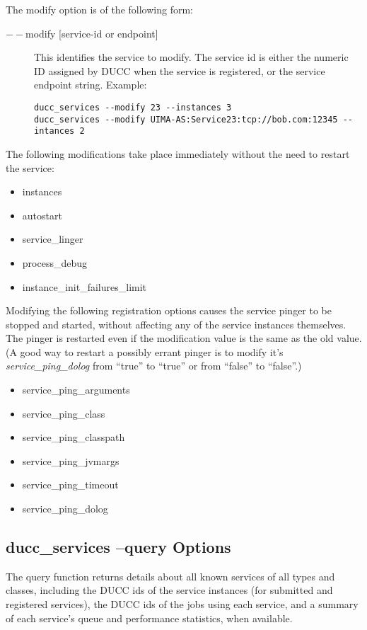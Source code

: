     The modify option is of the following form:
    \begin{description}

        \item[$--$modify {[service-id or endpoint]}]  This identifies the service to modify. The service id is either
          the numeric ID assigned by DUCC when the service is registered, or the service endpoint
          string.  Example:
\begin{verbatim}
ducc_services --modify 23 --instances 3 
ducc_services --modify UIMA-AS:Service23:tcp://bob.com:12345 --intances 2 
\end{verbatim}    
    \end{description}

    The following modifications take place immediately without the need to restart the service:
    \begin{itemize}
      \item instances
      \item autostart
      \item service\_linger
      \item process\_debug
      \item instance\_init\_failures\_limit
    \end{itemize}
      
    Modifying the following registration options causes the service pinger to be stopped and
    started, without affecting any of the service instances themselves.  The pinger is restarted
    even if the modification value is the same as the old value. (A good way to restart
    a possibly errant pinger is to modify it's {\em service\_ping\_dolog} from ``true'' to ``true'' or
    from ``false'' to ``false''.)
    \begin{itemize}
      \item service\_ping\_arguments
      \item service\_ping\_class
      \item service\_ping\_classpath
      \item service\_ping\_jvmargs
      \item service\_ping\_timeout
      \item service\_ping\_dolog
    \end{itemize}
    
    \subsection{ducc\_services --query Options}
    The query function returns details about all known services of all types and classes, including 
    the DUCC ids of the service instances (for submitted and registered services), the DUCC ids of 
    the jobs using each service, and a summary of each service's queue and performance statistics, 
    when available. 
    
